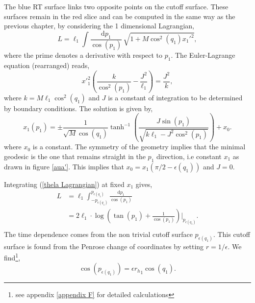 The blue RT surface links two opposite points on the cutoff surface. These surfaces remain in the red slice and can be computed in the same way as the previous chapter, by considering the 1 dimensional Lagrangian,
\begin{equation}\label{thela Lagrangian}
    L = \ell_1\int\frac{\text{d}p_1}{\cos(p_1)}\,\sqrt{1+M\cos^2(q_1)x_1'^2},
\end{equation}
where the prime denotes a derivative with respect to $p_1$. The Euler-Lagrange equation (rearranged) reads,
\begin{equation}
    x'_1^2\left(\frac{k}{\cos^2(p_1)}-\frac{J^2}{\ell_1}\right)=\frac{J^2}{k},
\end{equation}
where $k=M\ell_1\cos^2(q_1)$ and $J$ is a constant of integration to be determined by boundary conditions. The solution is given by,
\begin{equation}
    x_1(p_1) = \pm \frac{1}{\sqrt{M}\cos(q_1)}\tanh^{-1}\left(\frac{J\sin(p_1)}{\sqrt{k\ell_1-J^2\cos^2(p_1)}}\right) +x_0.
\end{equation}
where $x_0$ is a constant. The symmetry of the geometry implies that the minimal geodesic is the one that remains straight in the $p_1$ direction, i.e constant $x_1$ as drawn in figure \ref{aua'}. This implies that $x_0=x_1(\pi/2-\epsilon(q_1))$ and $J=0$. 

Integrating (\ref{thela Lagrangian}) at fixed $x_1$ gives,
\begin{align}
    L &= \ell_1\int_{-{p_{\epsilon(q_1)}}}^{p_{\epsilon(q_1)}}\frac{\text{d}p_1}{\cos(p_1)}\\
    &= 2\ell_1\cdot\log\left(\tan(p_1)+\frac{1}{\cos(p_1)}\right)\bigg|_{p_{\epsilon(q_1)}}.\\
\end{align}
The time dependence comes from the non trivial cutoff surface ${p_{\epsilon(q_1)}}$. This cutoff surface is found from the Penrose change of coordinates by setting $r=1/\epsilon$. We find\footnote{see appendix \ref{appendix F} for detailed calculations},
\begin{equation}
    \cos({p_{\epsilon(q_1)}}) = \epsilon{r_h}_1\cos(q_1).
\end{equation}

